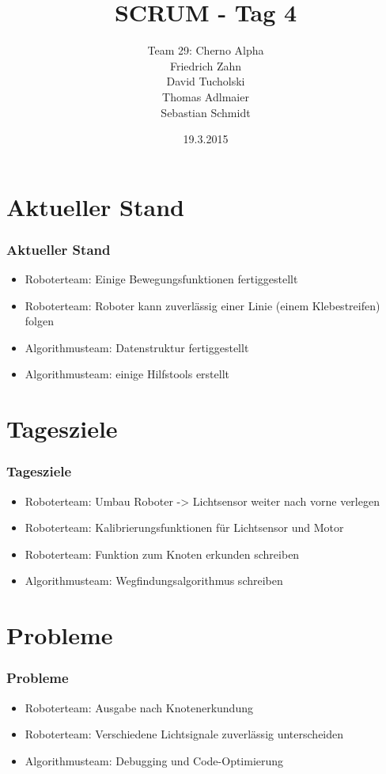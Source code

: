 \documentclass[ddcfooter,nototalpage]{tudbeamer}
\begin{document}
\title{SCRUM - Tag 4}
\author{Team 29: Cherno Alpha \\
Friedrich Zahn \\
David Tucholski \\
Thomas Adlmaier \\
Sebastian Schmidt
}
\date{19.3.2015}
\maketitle
\section{Aktueller Stand}
\begin{frame}
\frametitle{Aktueller Stand}
\normalsize
\begin{itemize}
\item Roboterteam: Einige Bewegungsfunktionen fertiggestellt
\item Roboterteam: Roboter kann zuverlässig einer Linie (einem Klebestreifen) folgen
\item Algorithmusteam: Datenstruktur fertiggestellt
\item Algorithmusteam: einige Hilfstools erstellt
\end{itemize}
\end{frame}
\section{Tagesziele}
\begin{frame}
\frametitle{Tagesziele}
\normalsize
\begin{itemize}
\item Roboterteam: Umbau Roboter -> Lichtsensor weiter nach vorne  verlegen
\item Roboterteam: Kalibrierungsfunktionen für Lichtsensor und Motor
\item Roboterteam: Funktion zum Knoten erkunden schreiben
\item Algorithmusteam: Wegfindungsalgorithmus schreiben
\end{itemize}
\end{frame}
\section{Probleme}
\begin{frame}
\frametitle{Probleme}
\normalsize
\begin{itemize}
\item Roboterteam: Ausgabe nach Knotenerkundung
\item Roboterteam: Verschiedene Lichtsignale zuverlässig unterscheiden
\item Algorithmusteam: Debugging und Code-Optimierung
\end{itemize}
\end{frame}
\end{document}

